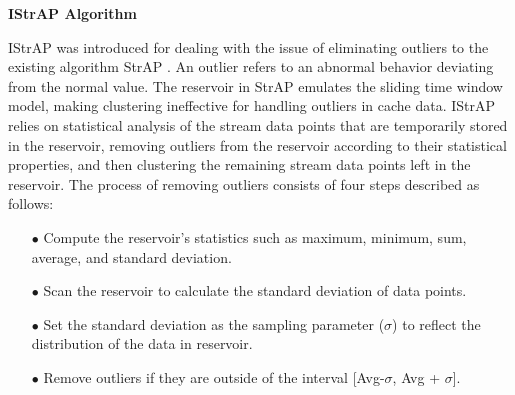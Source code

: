 



\textbf{IStrAP Algorithm}

IStrAP was introduced for dealing with the issue of eliminating outliers to the existing algorithm StrAP \cite{li2012improved}. An outlier refers to an abnormal behavior deviating from the normal value. The reservoir in StrAP emulates the sliding time window model, making clustering ineffective for handling outliers in cache data. IStrAP relies on statistical analysis of the stream data points that are temporarily stored in the reservoir, removing outliers from the reservoir according to their statistical properties, and then clustering the remaining stream data points left in the reservoir. The process of removing outliers consists of four steps described as follows:





\begin{itemize}
    \item[$\bullet$]  Compute the reservoir's statistics such as maximum, minimum, sum, average, and standard deviation.
    \item[$\bullet$] Scan the reservoir to calculate the standard deviation of data points.
    \item[$\bullet$]  Set the standard deviation as the sampling parameter ($\sigma$) to reflect the distribution of the data in reservoir.
    \item[$\bullet$] Remove outliers if they are outside of the interval [Avg-$\sigma$, Avg + $\sigma$].
\end{itemize}

